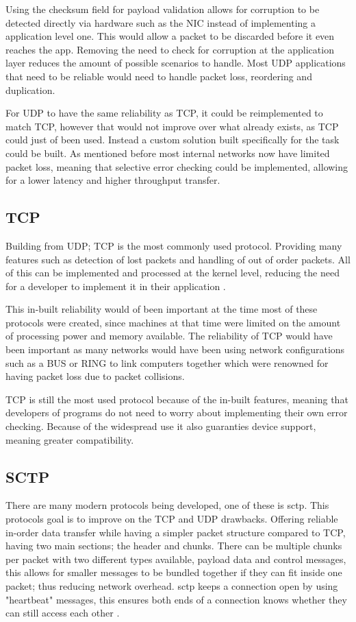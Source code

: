 Using the checksum field for payload validation allows for corruption to be detected directly via hardware such as the NIC instead of implementing a application level one. This would allow a packet to be discarded before it even reaches the app. Removing the need to check for corruption at the application layer reduces the amount of possible scenarios to handle. Most UDP applications that need to be reliable would need to handle packet loss, reordering and duplication.

For UDP to have the same reliability as TCP, it could be reimplemented to match TCP, however that would not improve over what already exists, as TCP could just of been used. Instead a custom solution built specifically for the task could be built. As mentioned before most internal networks now have limited packet loss, meaning that selective error checking could be implemented, allowing for a lower latency and higher throughput transfer.

\subsection*{TCP}
Building from UDP; TCP is the most commonly used protocol. Providing many features such as detection of lost packets and handling of out of order packets. All of this can be implemented and processed at the kernel level, reducing the need for a developer to implement it in their application \parencite{tcp-rfc793}.

This in-built reliability would of been important at the time most of these protocols were created, since machines at that time were limited on the amount of processing power and memory available. The reliability of TCP would have been important as many networks would have been using network configurations such as a BUS or RING to link computers together which were renowned for having packet loss due to packet collisions.

TCP is still the most used protocol because of the in-built features, meaning that developers of programs do not need to worry about implementing their own error checking. Because of the widespread use it also guaranties device support, meaning greater compatibility.

\subsection*{SCTP}
There are many modern protocols being developed, one of these is \acrfull{sctp}. This protocols goal is to improve on the TCP and UDP drawbacks. Offering reliable in-order data transfer while having a simpler packet structure compared to TCP, having two main sections; the header and chunks. There can be multiple chunks per packet with two different types available, payload data and control messages, this allows for smaller messages to be bundled together if they can fit inside one packet; thus reducing network overhead. \acrshort{sctp} keeps a connection open by using "heartbeat" messages, this ensures both ends of a connection knows whether they can still access each other \parencite{sctp-rfc9260} \parencite{ladha2004improving}.

